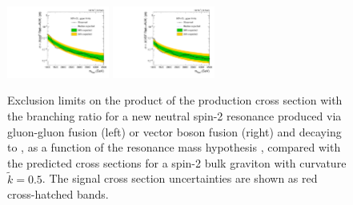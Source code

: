 \begin{figure}[htbp]
  \centering
  \includegraphics[width=0.3\textwidth]{fig/results/limits_RadToWW_o_74.pdf}
  \includegraphics[width=0.3\textwidth]{fig/results/limits_VBFRadToWW_o_74.pdf}
  \caption{
    Exclusion limits on the product of the production cross section with the branching ratio for a new neutral spin-2 resonance produced via gluon-gluon fusion (left) or vector boson fusion (right) and decaying to \WW, as a function of the resonance mass hypothesis \MX, compared with the predicted cross sections for a spin-2 bulk graviton with curvature $\tilde{k}=0.5$.
    The signal cross section uncertainties are shown as red cross-hatched bands.
  }
  \label{fig:exclusion_limits_spin2}
\end{figure}
